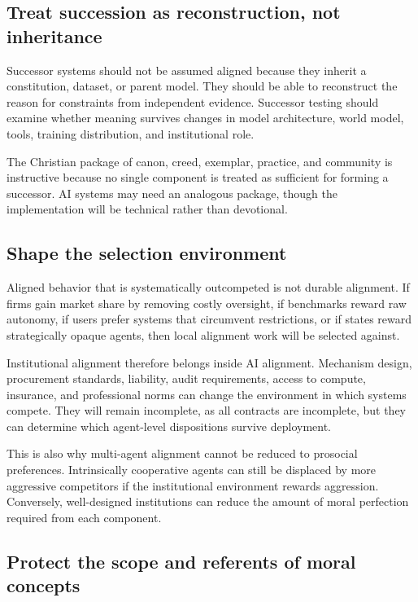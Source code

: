 \documentclass[11pt]{article}
\begin{document}
\subsection{Treat succession as reconstruction, not inheritance}

Successor systems should not be assumed aligned because they inherit a constitution, dataset, or parent model. They should be able to reconstruct the reason for constraints from independent evidence. Successor testing should examine whether meaning survives changes in model architecture, world model, tools, training distribution, and institutional role.

The Christian package of canon, creed, exemplar, practice, and community is instructive because no single component is treated as sufficient for forming a successor. AI systems may need an analogous package, though the implementation will be technical rather than devotional.

\subsection{Shape the selection environment}

Aligned behavior that is systematically outcompeted is not durable alignment. If firms gain market share by removing costly oversight, if benchmarks reward raw autonomy, if users prefer systems that circumvent restrictions, or if states reward strategically opaque agents, then local alignment work will be selected against.

Institutional alignment therefore belongs inside AI alignment. Mechanism design, procurement standards, liability, audit requirements, access to compute, insurance, and professional norms can change the environment in which systems compete. They will remain incomplete, as all contracts are incomplete, but they can determine which agent-level dispositions survive deployment.

This is also why multi-agent alignment cannot be reduced to prosocial preferences. Intrinsically cooperative agents can still be displaced by more aggressive competitors if the institutional environment rewards aggression. Conversely, well-designed institutions can reduce the amount of moral perfection required from each component.

\subsection{Protect the scope and referents of moral concepts}
\end{document}

